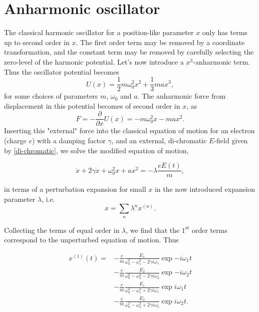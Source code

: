 \documentclass{article}
\begin{document}
\section*{Anharmonic oscillator}
The classical harmonic oscillator for a position-like parameter $x$ only has terms up to second order in $x$. The first order term may be removed by a coordinate transformation, and the constant term may be removed by carefully selecting the zero-level of the harmonic potential. Let's now introduce a $x^3$-anharmonic term. Thus the oscillator potential becomes
\begin{equation}
U(x) = \frac{1}{2}m\omega_0^2 x^2 + \frac{1}{3}ma x^3,
\end{equation}
for some choices of parameters $m$, $\omega_0$ and $a$.
The anharmonic force from displacement in this potential becomes of second order in $x$, as
\begin{equation}
F = -\frac{\partial}{\partial x}U(x) = -m\omega_0^2 x - max^2.
\end{equation}
Inserting this "external" force into the classical equation of motion for an electron (charge $e$) with a damping factor $\gamma$, and an external, di-chromatic $E$-field given by \cref{di-chromatic}, we solve the modified equation of motion,

\begin{equation}
\ddot{x} + 2\gamma\dot{x}+\omega_0^2x + ax^2 = -\lambda\frac{e E(t)}{m},
\end{equation}

in terms of a perturbation expansion for small $x$ in the now introduced expansion parameter $\lambda$, i.e.
\begin{equation}
x = \sum_n \lambda^n x^{(n)}.
\end{equation}

Collecting the terms of equal order in $\lambda$, we find that the $1^{\text{st}}$ order terms correspond to the unperturbed equation of motion. Thus

\begin{equation}
\label{x1_ugly}
\begin{aligned}
x^{(1)}(t) = & -\frac{e}{m}\frac{E_1}{\omega_0^2-\omega_1^2-2\gamma i\omega_1}\exp{-i\omega_1 t} \\
& -\frac{e}{m}\frac{E_2}{\omega_0^2-\omega_2^2-2\gamma i\omega_2}\exp{-i\omega_2 t} \\
&-\frac{e}{m}\frac{E_1}{\omega_0^2-\omega_1^2+2\gamma i\omega_1}\exp{i\omega_1 t} \\
& -\frac{e}{m}\frac{E_2}{\omega_0^2-\omega_2^2+2\gamma i\omega_2}\exp{i\omega_2 t}.
\end{aligned}
\end{equation}
\end{document}
